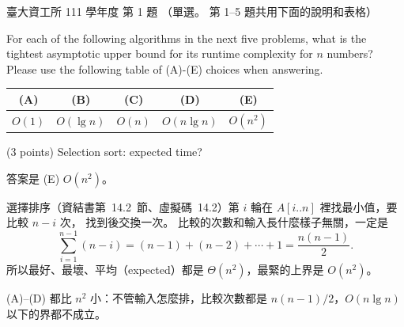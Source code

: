 \begin{pastexam}[label={px:ntu-111-dsaa-01}]{臺大資工所 111 學年度 第 1 題}
（單選。 第 1--5 題共用下面的說明和表格）

For each of the following algorithms in the next five problems, what is the tightest asymptotic
upper bound for its runtime complexity for $n$ numbers? Please use the following table of (A)-(E)
choices when answering.
\begin{center}
\begin{tabular}{c|c|c|c|c}
(A) & (B) & (C) & (D) & (E) \\ \hline
$O(1)$ & $O(\lg n)$ & $O(n)$ & $O(n\lg n)$ & $O(n^2)$
\end{tabular}
\end{center}

(3 points) Selection sort: expected time?
\end{pastexam}

\begin{pastsoln}
答案是 (E) $O(n^2)$。

選擇排序（資結書第~14.2~節、虛擬碼~14.2）第 $i$ 輪在 $A[i..n]$ 裡找最小值，要比較 $n - i$ 次，
找到後交換一次。 比較的次數和輸入長什麼樣子無關，一定是
\[
\sum_{i=1}^{n-1} (n - i) = (n - 1) + (n - 2) + \cdots + 1 = \frac{n(n-1)}{2}.
\]
所以最好、最壞、平均（expected）都是 $\Theta(n^2)$，最緊的上界是 $O(n^2)$。

(A)--(D) 都比 $n^2$ 小：不管輸入怎麼排，比較次數都是 $n(n-1)/2$，$O(n \lg n)$ 以下的界都不成立。
\end{pastsoln}
